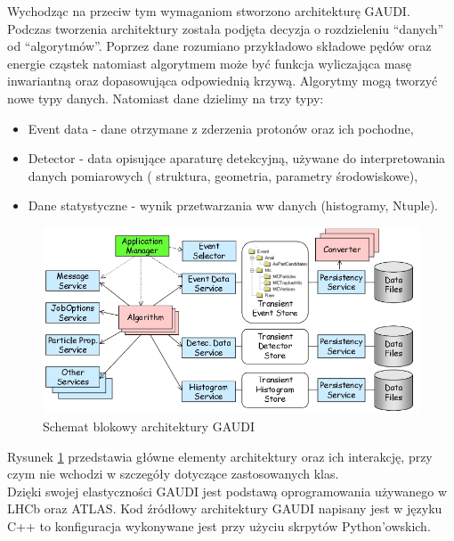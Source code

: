 Wychodząc na przeciw tym wymaganiom stworzono architekturę GAUDI\cite{GAUDI}. Podczas tworzenia architektury została podjęta decyzja o rozdzieleniu ``danych'' od ``algorytmów''. Poprzez dane rozumiano przykładowo składowe pędów oraz energie cząstek natomiast algorytmem może być funkcja wyliczająca masę inwariantną oraz dopasowująca odpowiednią krzywą. Algorytmy mogą tworzyć nowe typy danych. Natomiast dane dzielimy na trzy typy:
\begin{itemize}
 \item Event data - dane otrzymane z zderzenia protonów oraz ich pochodne,
 \item Detector - data opisujące aparaturę detekcyjną, używane do interpretowania danych pomiarowych ( struktura, geometria, parametry środowiskowe),
 \item Dane statystyczne - wynik przetwarzania ww danych (histogramy, Ntuple).
\end{itemize}
 \begin{figure}[h]
 \centering
 \includegraphics[scale=0.8]{rozdzial4/GAUDI.jpeg}
 \caption{Schemat blokowy architektury GAUDI\cite{GAUDI}}
 \label{rys:GAUDI architektura}
\end{figure}

Rysunek \ref{rys:GAUDI architektura} przedstawia główne elementy architektury oraz ich interakcję, przy czym nie wchodzi w szczegóły dotyczące zastosowanych klas. \\
Dzięki swojej elastyczności GAUDI jest podstawą oprogramowania używanego w LHCb oraz ATLAS.
Kod źródłowy architektury GAUDI napisany jest w języku C++ to konfiguracja wykonywane jest przy użyciu skrpytów Python'owskich.

